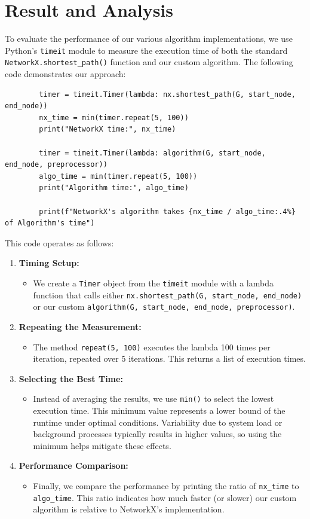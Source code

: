 \chapter{Result and Analysis}
	To evaluate the performance of our various algorithm implementations, we use Python's \texttt{timeit} module to measure the execution time of both the standard \texttt{NetworkX.shortest\_path()} function and our custom algorithm. The following code demonstrates our approach:
	
	\begin{lstlisting}
		timer = timeit.Timer(lambda: nx.shortest_path(G, start_node, end_node))
		nx_time = min(timer.repeat(5, 100))
		print("NetworkX time:", nx_time)
		
		timer = timeit.Timer(lambda: algorithm(G, start_node, end_node, preprocessor))
		algo_time = min(timer.repeat(5, 100))
		print("Algorithm time:", algo_time)
		
		print(f"NetworkX's algorithm takes {nx_time / algo_time:.4%} of Algorithm's time")
	\end{lstlisting}
	
	This code operates as follows:
	\begin{enumerate}
		\item \textbf{Timing Setup:}  
		\begin{itemize}
			\item We create a \texttt{Timer} object from the \texttt{timeit} module with a lambda function that calls either \texttt{nx.shortest\_path(G, start\_node, end\_node)} or our custom \texttt{algorithm(G, start\_node, end\_node, preprocessor)}.
		\end{itemize}
		\item \textbf{Repeating the Measurement:}  
		\begin{itemize}
			\item The method \texttt{repeat(5, 100)} executes the lambda 100 times per iteration, repeated over 5 iterations. This returns a list of execution times.
		\end{itemize}
		\item \textbf{Selecting the Best Time:}  
		\begin{itemize}
			\item Instead of averaging the results, we use \texttt{min()} to select the lowest execution time. This minimum value represents a lower bound of the runtime under optimal conditions. Variability due to system load or background processes typically results in higher values, so using the minimum helps mitigate these effects.
		\end{itemize}
		\item \textbf{Performance Comparison:}  
		\begin{itemize}
			\item Finally, we compare the performance by printing the ratio of \texttt{nx\_time} to \texttt{algo\_time}. This ratio indicates how much faster (or slower) our custom algorithm is relative to NetworkX's implementation.
		\end{itemize}
	\end{enumerate}
	
